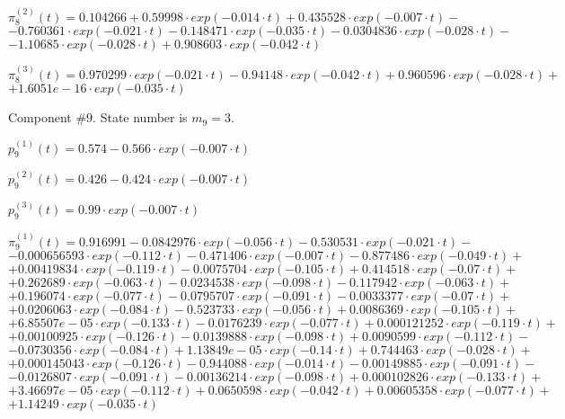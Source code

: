  $\pi^{(2)}_8(t)=0.104266+0.59998\cdot exp(-0.014\cdot t)+0.435528\cdot exp(-0.007\cdot t)-$
$-0.760361\cdot exp(-0.021\cdot t)-0.148471\cdot exp(-0.035\cdot t)-0.0304836\cdot exp(-0.028\cdot t)-$
$-1.10685\cdot exp(-0.028\cdot t)+0.908603\cdot exp(-0.042\cdot t)$

 $\pi^{(3)}_8(t)=0.970299\cdot exp(-0.021\cdot t)-0.94148\cdot exp(-0.042\cdot t)+0.960596\cdot exp(-0.028\cdot t)+$
$+1.6051e-16\cdot exp(-0.035\cdot t)$

 Component #$9$. State number is $m_9=3$.

 $p^{(1)}_9(t)=0.574-0.566\cdot exp(-0.007\cdot t)$

 $p^{(2)}_9(t)=0.426-0.424\cdot exp(-0.007\cdot t)$

 $p^{(3)}_9(t)=0.99\cdot exp(-0.007\cdot t)$

 $\pi^{(1)}_9(t)=0.916991-0.0842976\cdot exp(-0.056\cdot t)-0.530531\cdot exp(-0.021\cdot t)-$
$-0.000656593\cdot exp(-0.112\cdot t)-0.471406\cdot exp(-0.007\cdot t)-0.877486\cdot exp(-0.049\cdot t)+$
$+0.00419834\cdot exp(-0.119\cdot t)-0.0075704\cdot exp(-0.105\cdot t)+0.414518\cdot exp(-0.07\cdot t)+$
$+0.262689\cdot exp(-0.063\cdot t)-0.0234538\cdot exp(-0.098\cdot t)-0.117942\cdot exp(-0.063\cdot t)+$
$+0.196074\cdot exp(-0.077\cdot t)-0.0795707\cdot exp(-0.091\cdot t)-0.0033377\cdot exp(-0.07\cdot t)+$
$+0.0206063\cdot exp(-0.084\cdot t)-0.523733\cdot exp(-0.056\cdot t)+0.0086369\cdot exp(-0.105\cdot t)+$
$+6.85507e-05\cdot exp(-0.133\cdot t)-0.0176239\cdot exp(-0.077\cdot t)+0.000121252\cdot exp(-0.119\cdot t)+$
$+0.00100925\cdot exp(-0.126\cdot t)-0.0139888\cdot exp(-0.098\cdot t)+0.0090599\cdot exp(-0.112\cdot t)-$
$-0.0730356\cdot exp(-0.084\cdot t)+1.13849e-05\cdot exp(-0.14\cdot t)+0.744463\cdot exp(-0.028\cdot t)+$
$+0.000145043\cdot exp(-0.126\cdot t)-0.944088\cdot exp(-0.014\cdot t)-0.00149885\cdot exp(-0.091\cdot t)-$
$-0.0126807\cdot exp(-0.091\cdot t)-0.00136214\cdot exp(-0.098\cdot t)+0.000102826\cdot exp(-0.133\cdot t)+$
$+3.46697e-05\cdot exp(-0.112\cdot t)+0.0650598\cdot exp(-0.042\cdot t)+0.00605358\cdot exp(-0.077\cdot t)+$
$+1.14249\cdot exp(-0.035\cdot t)$

